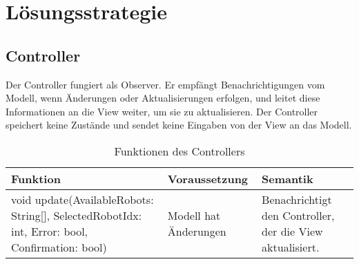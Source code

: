 \chapter{Lösungsstrategie}

\section{Controller}
Der Controller fungiert als Observer. 
Er empfängt Benachrichtigungen vom Modell, wenn Änderungen oder Aktualisierungen erfolgen, und leitet diese Informationen an die View weiter, um sie zu aktualisieren. 
Der Controller speichert keine Zustände und sendet keine Eingaben von der View an das Modell.

\begin{table}[h!]
    \centering
    \begin{tabular}{|p{5cm}|p{5cm}|p{5cm}|}
        \hline
        \textbf{Funktion} & \textbf{Voraussetzung} & \textbf{Semantik} \\
        \hline
        void update(AvailableRobots: String[], SelectedRobotIdx: int, Error: bool, Confirmation: bool) & Modell hat Änderungen & Benachrichtigt den Controller, der die View aktualisiert. \\
        \hline
    \end{tabular}
    \caption{Funktionen des Controllers}
    \label{tab:Controller}
\end{table}


